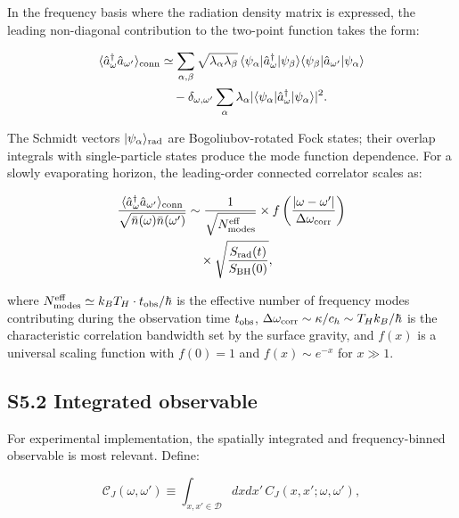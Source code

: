 \documentclass[prd,aps,showpacs,superscriptaddress,twocolumn]{revtex4-2}
\begin{document}
In the frequency basis where the radiation density matrix is expressed, the leading non-diagonal contribution to the two-point function takes the form:

\begin{align}
\langle \hat{a}_\omega^\dagger \hat{a}_{\omega'} \rangle_{\rm conn} &\simeq \sum_{\alpha,\beta} \sqrt{\lambda_\alpha \lambda_\beta} \, \langle \psi_\alpha | \hat{a}_\omega^\dagger |\psi_\beta\rangle \langle \psi_\beta | \hat{a}_{\omega'} |\psi_\alpha\rangle \nonumber\\
&\quad - \delta_{\omega,\omega'} \sum_\alpha \lambda_\alpha |\langle \psi_\alpha | \hat{a}_\omega^\dagger |\psi_\alpha\rangle|^2.
\label{eq:connected_part}
\end{align}

The Schmidt vectors $|\psi_\alpha\rangle_{\rm rad}$ are Bogoliubov-rotated Fock states; their overlap integrals with single-particle states produce the mode function dependence. For a slowly evaporating horizon, the leading-order connected correlator scales as:

\begin{align}
\frac{\langle \hat{a}_\omega^\dagger \hat{a}_{\omega'} \rangle_{\rm conn}}{\sqrt{\bar{n}(\omega)\bar{n}(\omega')}} &\sim \frac{1}{\sqrt{N_{\rm modes}^{\rm eff}}} \times f\left(\frac{|\omega-\omega'|}{\Delta\omega_{\rm corr}}\right) \nonumber\\
&\quad \times \sqrt{\frac{S_{\rm rad}(t)}{S_{\rm BH}(0)}},
\label{eq:scaling_relation}
\end{align}

where $N_{\rm modes}^{\rm eff} \simeq k_B T_H \cdot t_{\rm obs} / \hbar$ is the effective number of frequency modes contributing during the observation time $t_{\rm obs}$, $\Delta\omega_{\rm corr} \sim \kappa/c_h \sim T_H k_B/\hbar$ is the characteristic correlation bandwidth set by the surface gravity, and $f(x)$ is a universal scaling function with $f(0)=1$ and $f(x) \sim e^{-x}$ for $x \gg 1$.

\subsection{S5.2 Integrated observable}

For experimental implementation, the spatially integrated and frequency-binned observable is most relevant. Define:

\begin{equation}
\mathcal{C}_J(\omega,\omega') \equiv \int_{x,x' \in \mathcal{D}} dx dx' \, C_J(x,x';\omega,\omega'),
\label{eq:integrated_CJ}
\end{equation}
\end{document}
